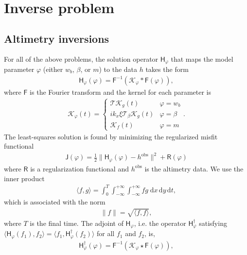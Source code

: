 \documentclass[paper=a4, fontsize=11pt]{article}
\begin{document}
\section*{Inverse problem}
\subsection*{Altimetry inversions}
For all of the above problems, the solution operator $\mathsf{H}_\varphi$ that maps the model
parameter $\varphi$ (either $w_b$, $\beta$, or $m$) to the data $h$ takes the form
\begin{align}
\mathsf{H}_\varphi(\varphi) = \mathsf{F}^{-1} \left( \mathcal{K}_\varphi* \mathsf{F}(\varphi)\right),
\end{align}
where $\mathsf{F}$ is the Fourier transform and the kernel for each parameter is
\begin{align}
\mathcal{K}_\varphi(t) =
\begin{cases}
\mathcal{T}\mathcal{K}_g(t) & \varphi = w_b \\
ik_x\xi\mathcal{T}_{\beta}\mathcal{K}_g(t) & \varphi = \beta \\
\mathcal{K}_f(t) & \varphi = m
\end{cases} .
\end{align}
The least-squares solution is found by minimizing the regularized misfit functional
\begin{align}
\mathsf{J}(\varphi) = \frac{1}{2}\| \mathsf{H}_\varphi(\varphi) - h^{\mathrm{obs}} \|^2 + \mathsf{R}(\varphi) \label{lsq}
\end{align}
where $\mathsf{R}$ is a regularization functional and $h^{\mathrm{obs}}$ is the altimetry data.
We use the inner product
\begin{align}
\langle f,g\rangle = \int_0^T \int_{-\infty}^{+\infty} \int_{-\infty}^{+\infty} fg \;\mathrm{d}x\,\mathrm{d}y\,\mathrm{d}t,
\end{align}
which is associated with the norm
\begin{align}
\| f \| = \sqrt{\langle f,f\rangle},
\end{align}
where $T$ is the final time.
The adjoint of $\mathsf{H}_\varphi$, i.e. the operator $\mathsf{H}_\varphi^\dagger$  satisfying
$\langle \mathsf{H}_\varphi(f_1),f_2 \rangle = \langle f_1, \mathsf{H}_\varphi^\dagger(f_2)
\rangle$ for all $f_1$ and $f_2$, is,
\begin{align}
\mathsf{H}_\varphi^\dagger (\varphi) = \mathsf{F}^{-1} \left( \mathcal{K}_\varphi \star \mathsf{F}(\varphi)\right),
\end{align}
\end{document}
